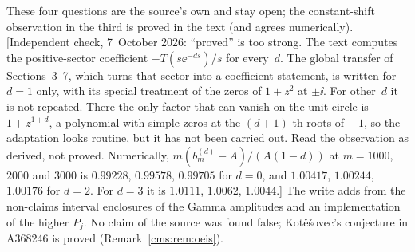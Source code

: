 \begin{writenote}
These four questions are the source's own and stay open; the constant-shift
observation in the third is proved in the text (and agrees numerically).
[Independent check, 7~October 2026: ``proved'' is too strong. The text
computes the positive-sector coefficient $-T(s\ee^{-ds})/s$ for every~$d$. The
global transfer of Sections~3--7, which turns that sector into a coefficient
statement, is written for $d=1$ only, with its special treatment of the zeros
of $1+z^2$ at $\pm\ii$. For other~$d$ it is not repeated. There the only
factor that can vanish on the unit circle is $1+z^{1+d}$, a polynomial with
simple zeros at the $(d+1)$-th roots of~$-1$, so the adaptation looks routine,
but it has not been carried out. Read the observation as derived, not proved.
Numerically, $m(b^{(d)}_m-A)/(A(1-d))$ at $m=1000$, $2000$ and $3000$ is
$0.99228$, $0.99578$, $0.99705$ for $d=0$, and $1.00417$, $1.00244$,
$1.00176$ for $d=2$. For $d=3$ it is $1.0111$, $1.0062$, $1.0044$.] The
write adds from the non-claims interval enclosures of the Gamma amplitudes
and an implementation of the higher $P_j$. No claim of the source was found
false; Kot\v{e}\v{s}ovec's conjecture in A368246 is proved
(Remark~\ref{cms:rem:oeis}).
\end{writenote}

